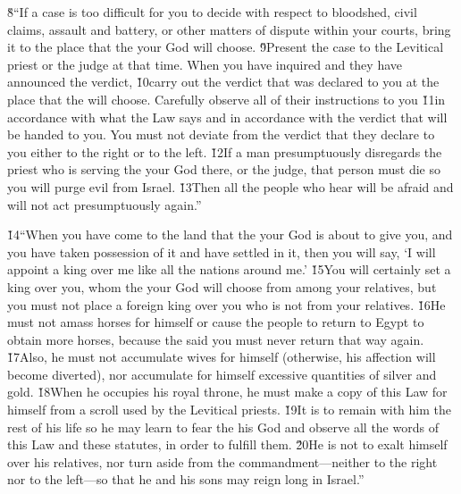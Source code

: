 \v{8}``If a case is too difficult for you to decide with respect to bloodshed, civil claims, assault and battery, or other matters of dispute within your courts, bring it to the place that the  your God will choose. \v{9}Present the case to the Levitical priest or the judge at that time. When you have inquired and they have announced the verdict, \v{10}carry out the verdict that was declared to you at the place that the  will choose. Carefully observe all of their instructions to you \v{11}in accordance with what the Law says and in accordance with the verdict that will be handed to you. You must not deviate from the verdict that they declare to you either to the right or to the left. \v{12}If a man presumptuously disregards the priest who is serving the  your God there, or the judge, that person must die so you will purge evil from Israel. \v{13}Then all the people who hear will be afraid and will not act presumptuously again.''

\v{14}``When you have come to the land that the  your God is about to give you, and you have taken possession of it and have settled in it, then you will say, `I will appoint a king over me like all the nations around me.' \v{15}You will certainly set a king over you, whom the  your God will choose from among your relatives, but you must not place a foreign king over you who is not from your relatives. \v{16}He must not amass horses for himself or cause the people to return to Egypt to obtain more horses, because the  said you must never return that way again. \v{17}Also, he must not accumulate wives for himself (otherwise, his affection will become diverted), nor accumulate for himself excessive quantities of silver and gold. \v{18}When he occupies his royal throne, he must make a copy of this Law for himself from a scroll used by the Levitical priests. \v{19}It is to remain with him the rest of his life so he may learn to fear the  his God and observe all the words of this Law and these statutes, in order to fulfill them. \v{20}He is not to exalt himself over his relatives, nor turn aside from the commandment---neither to the right nor to the left---so that he and his sons may reign long in Israel.''

